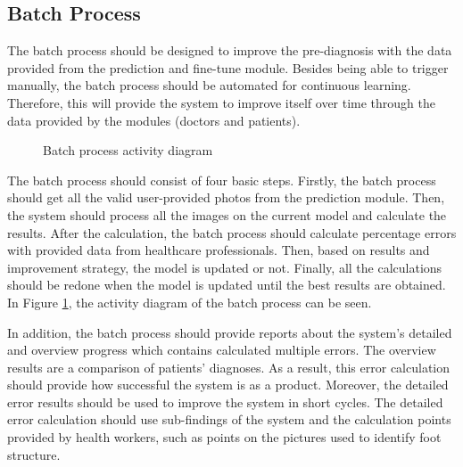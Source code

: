 \subsection{ Batch Process }

The batch process should be designed to improve the pre-diagnosis with the data provided from the prediction and fine-tune module. Besides being able to trigger manually, the batch process should be automated for continuous learning. Therefore, this will provide the system to improve itself over time through the data provided by the modules (doctors and patients). 

\begin{figure}[htbp]
\centering
{}
\caption{Batch process activity diagram}
\label{fig:BatchProcessActivityDiagram}
\end{figure}

The batch process should consist of four basic steps. Firstly, the batch process should get all the valid user-provided photos from the prediction module. Then, the system should process all the images on the current model and calculate the results. After the calculation, the batch process should calculate percentage errors with provided data from healthcare professionals. Then, based on results and improvement strategy, the model is updated or not. Finally, all the calculations should be redone when the model is updated until the best results are obtained. In Figure \ref{fig:BatchProcessActivityDiagram}, the activity diagram of the batch process can be seen.

In addition, the batch process should provide reports about the system's detailed and overview progress which contains calculated multiple errors. The overview results are a comparison of patients' diagnoses. As a result, this error calculation should provide how successful the system is as a product. Moreover, the detailed error results should be used to improve the system in short cycles. The detailed error calculation should use sub-findings of the system and the calculation points provided by health workers, such as points on the pictures used to identify foot structure. 

